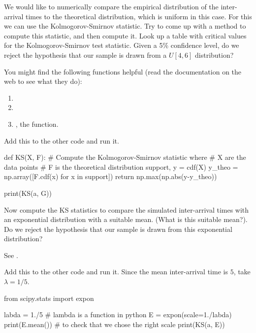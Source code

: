 \begin{exercise}
We would like to numerically compare the empirical distribution of the inter-arrival times to the theoretical distribution, which is uniform in this case. 
For this we can use the Kolmogorov-Smirnov statistic. Try to come up with a method to compute this statistic, and then compute it. 
Look up a table with critical values for the Kolmogorov-Smirnov test statistic.
Given a 5\% confidence level, do we reject the hypothesis that our sample is drawn from a $U[4,6]$ distribution?

You might find the following functions helpful (read the documentation on the web to see what they do):
\begin{enumerate}
\item {}
\item {}
\item {}, the  function.
\end{enumerate}

\begin{solution}
Add this to the other code and run it.
\begin{pyverbatim}
def KS(X, F):
    # Compute the Kolmogorov-Smirnov statistic where
    # X are the data points
    # F is the theoretical distribution
    support, y = cdf(X)
    y_theo = np.array([F.cdf(x) for x in support])
    return np.max(np.abs(y-y_theo))

print(KS(a, G))    
\end{pyverbatim}
\end{solution}
\end{exercise}

\begin{exercise}
  Now compute the KS statistics to compare the simulated inter-arrival times with an exponential distribution with a suitable mean. (What is this suitable mean?).
  Do we reject the hypothesis that our sample is drawn from this exponential distribution?

See .


\begin{solution}
Add this to the other code and run it. Since the mean inter-arrival time is $5$, take $\lambda = 1/5$.

\begin{pyverbatim}
from scipy.stats import expon

labda = 1./5 # lambda is a function in python
E = expon(scale=1./labda) 
print(E.mean()) # to check that we chose the right scale
print(KS(a, E))    
\end{pyverbatim}
\end{solution}
\end{exercise}

